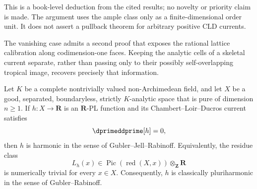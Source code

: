 This is a book-level deduction from the cited results; no novelty or priority
claim is made.  The argument uses the ample class only as a finite-dimensional
order unit.  It does not assert a pullback theorem for arbitrary positive CLD
currents.

The vanishing case admits a second proof that exposes the rational lattice
calibration along codimension-one faces.  Keeping the analytic cells of a
skeletal current separate, rather than passing only to their possibly
self-overlapping tropical image, recovers precisely that information.

\begin{proposition}
\label{prop:ch18-real-pl-zero-current-harmonic}
Let \(K\) be a complete nontrivially valued non-Archimedean field, and let
\(X\) be a good, separated, boundaryless, strictly \(K\)-analytic space that is
pure of dimension \(n\geq1\).  If \(h:X\to\mathbf R\) is an \(\mathbf R\)-PL
function and its Chambert--Loir--Ducros current satisfies
\[
                         \dprimeddprime[h]=0,
\]
then \(h\) is harmonic in the sense of Gubler--Jell--Rabinoff.  Equivalently,
the residue class
\[
 L_h(x)\in\operatorname{Pic}(\operatorname{red}(X,x))
                  \otimes_{\mathbf Z}\mathbf R
\]
is numerically trivial for every \(x\in X\).  Consequently, \(h\) is
classically pluriharmonic in the sense of Gubler--Rabinoff.
\end{proposition}


